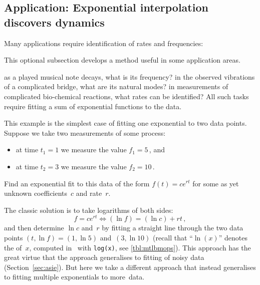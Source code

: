 









\begin{draft}%
\subsection{Application: Exponential interpolation discovers dynamics}
\label{sec:eidd}


Many applications require identification of rates and frequencies:
\begin{aside}
This optional subsection develops a method useful in some application areas.
\end{aside}%
as a played musical note decays, what is its frequency?
in the observed vibrations of a complicated bridge, what are its natural modes?
in measurements of complicated bio-chemical reactions, what rates can be identified?
All such tasks require fitting a sum of exponential functions to the data.


\begin{example} \label{eg:}
This example is the simplest case of fitting one exponential to two data points.
Suppose we take two measurements of some process: 
\begin{itemize}
\item at time \(t_1=1\) we measure the value \(f_1=5\)\,, and 
\item at time \(t_2=3\) we measure the value \(f_2=10\)\,.
\end{itemize}
Find an exponential fit to this data of the form \(f(t)=ce^{rt}\) for some as yet unknown coefficients~\(c\) and rate~\(r\).
\begin{solution} 
The classic solution is to take logarithms of both sides:
\begin{equation*}
f=ce^{rt} \iff (\ln f)=(\ln c)+rt\,,
\end{equation*}
and then determine \(\ln c\) and~\(r\) by fitting a straight line through the two data points \((t,\ln f)=(1,\ln5)\) and~\((3,\ln10)\)
(recall that ``\(\ln(x)\)'' denotes the  of~\(x\),  computed in \script\ with \verb|log(x)|, see \autoref{tbl:mtlbmops}).
This approach has the great virtue that the approach generalises to fitting of noisy data (Section~\ref{sec:asie}).
But here we take a different approach that instead generalises to fitting multiple exponentials to more~data.


\end{solution}
\end{example}
\end{draft}
